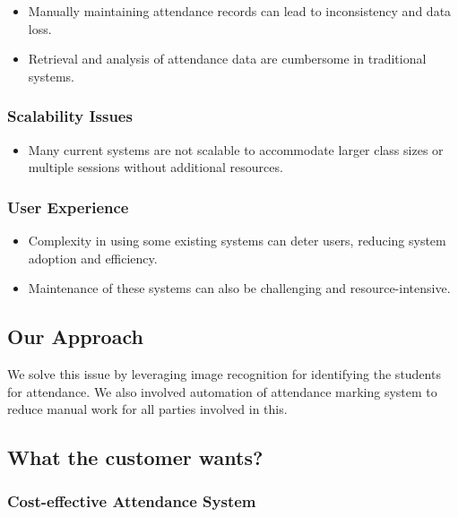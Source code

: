 \documentclass[a4paper,12pt]{article}
\begin{document}
\begin{itemize}
    \item Manually maintaining attendance records can lead to inconsistency and data loss.
    \item Retrieval and analysis of attendance data are cumbersome in traditional systems.
\end{itemize}

\subsubsection{Scalability Issues}

\begin{itemize}
    \item Many current systems are not scalable to accommodate larger class sizes or multiple sessions without additional resources.
\end{itemize}

\subsubsection{User Experience}

\begin{itemize}
    \item Complexity in using some existing systems can deter users, reducing system adoption and efficiency.
    \item Maintenance of these systems can also be challenging and resource-intensive.
\end{itemize}

\subsection{Our Approach}

We solve this issue by leveraging image recognition for identifying the students for attendance.
We also involved automation of attendance marking system to reduce manual work for all parties involved in this.

\subsection{What the customer wants?}

\subsubsection{Cost-effective Attendance System}
\end{document}
